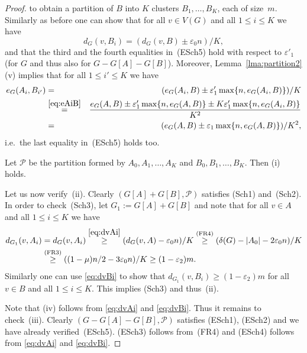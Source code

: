 \documentclass{memo-l}
\def\COMMENT#1{}
\def\eps{\varepsilon}
\numberwithin{section}{chapter}
\numberwithin{equation}{section}
\numberwithin{firstthm}{section}
\numberwithin{figure}{section}
\begin{document}
\begin{proof}
to obtain a partition of $B$ into $K$ clusters $B_1,\dots,B_K$, each of size~$m$.
Similarly as before one can show that for all $v \in V(G)$ and all $1 \le i \le K$ we have
\begin{equation}\label{eq:dvBi}
d_G(v,B_i) = (d_G(v,B) \pm \eps_0 n)/K,
\end{equation}
and that the third and the fourth equalities in~(ESch5) hold with respect to $\eps ' _1$
(for $G$ and thus also for $G - G[A] - G[B]$).
Moreover, Lemma~\ref{lma:partition2}(v) implies that for all $1 \le i' \le K$ we have
\begin{eqnarray*}
e_G(A_i, B_{i'}) & = & (e_G(A_i, B) \pm \eps'_1 \max\{n, e_G(A_i, B)\})/K\\
& \stackrel{\eqref{eq:eAiB}}{=} & \frac{e_G(A, B) \pm \eps'_1 \max\{n, e_G(A, B)\} \pm K \eps'_1 \max\{n, e_G(A_i, B)\}}{K^2}\\
& = & (e_G(A, B) \pm \eps_1 \max\{n, e_G(A, B)\})/K^2,
\end{eqnarray*}
i.e.~the last equality in~(ESch5) holds too.%
   \COMMENT{Daniela: replaced $e_G(A, B)$ by $ \max\{n, e_G(A, B)\}$ in the last displayed expression}
Let $\mathcal{P}$ be the partition formed by $A_0,A_1,\dots,A_K$ and $B_0,B_1,\dots,B_K$.
Then (i) holds.

Let us now verify~(ii). Clearly $(G[A]+G[B], \mathcal{P})$ satisfies (Sch1) and~(Sch2). In order to check~(Sch3), let
$G_1:=G[A]+G[B]$ and note that for all $v \in A$ and all $1 \le i \le K$ we have 
\begin{align*}
d_{G_1}(v,A_i) & = d_{G}(v,A_i)\stackrel{\eqref{eq:dvAi}}{\ge} (d_G(v,A) -\eps_0 n)/K 
\stackrel{\rm (FR4)}{\ge} (\delta(G)- |A_0|-2\eps_0 n)/K\\
& \stackrel{\rm (FR3)}{\ge} ((1- \mu ) n/2-3\eps_0 n)/K\ge (1-\eps_2)m.
\end{align*}
Similarly one can use \eqref{eq:dvBi} to show that $d_{G_1}(v,B_i)\ge (1-\eps_2)m$ for all $v \in B$ and all $1 \le i \le K$.
This implies (Sch3) and thus~(ii).

Note that (iv) follows from \eqref{eq:dvAi} and \eqref{eq:dvBi}. Thus it remains to check~(iii).
Clearly $(G - G[A] - G[B], \mathcal{P})$ satisfies (ESch1), (ESch2) and we have already verified~(ESch5).
(ESch3) follows from~(FR4) and (ESch4) follows from \eqref{eq:dvAi} and \eqref{eq:dvBi}.
\end{proof}







\end{document}
